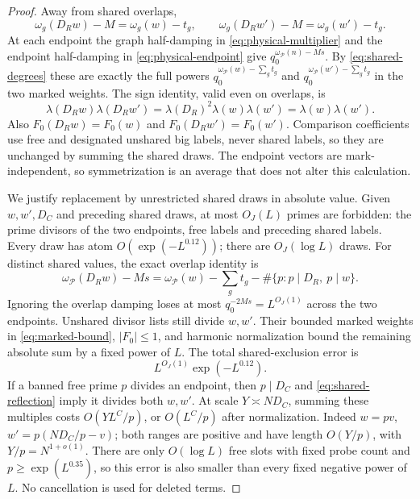 \documentclass[11pt]{article}
\theoremstyle{definition}
\newcommand{\Pset}{\mathcal P}
\theoremstyle{remark}
\begin{document}
\begin{proof}
Away from shared overlaps,
\begin{equation}\label{eq:shared-degrees}
\omega_g(D_Rw)-M=\omega_g(w)-t_g,\qquad
\omega_g(D_Rw')-M=\omega_g(w')-t_g.
\end{equation}
At each endpoint the graph half-damping in
\eqref{eq:physical-multiplier} and the endpoint half-damping in
\eqref{eq:physical-endpoint} give
$q_0^{\omega_{\Pset}(n)-Ms}$.
By \eqref{eq:shared-degrees} these are exactly the full powers
$q_0^{\omega_{\Pset}(w)-\sum_gt_g}$ and
$q_0^{\omega_{\Pset}(w')-\sum_gt_g}$ in the two marked weights.
The sign identity, valid even on overlaps, is
\begin{equation}\label{eq:shared-sign}
\lambda(D_Rw)\lambda(D_Rw')
=\lambda(D_R)^2\lambda(w)\lambda(w')
=\lambda(w)\lambda(w').
\end{equation}
Also $F_0(D_Rw)=F_0(w)$ and $F_0(D_Rw')=F_0(w')$.
Comparison coefficients use free and designated unshared big labels,
never shared labels, so they are unchanged by summing the shared draws.
The endpoint vectors are mark-independent, so symmetrization is an
average that does not alter this calculation.

We justify replacement by unrestricted shared draws in absolute
value. Given $w,w',D_C$ and preceding shared draws, at most
$O_J(L)$ primes are forbidden: the prime divisors of the two endpoints,
free labels and preceding shared labels.
Every draw has atom $O(\exp(-L^{0.12}))$; there are $O_J(\log L)$
draws. For distinct shared values, the exact overlap identity is
\begin{equation}\label{eq:overlap-degree}
\omega_{\Pset}(D_Rw)-Ms
=\omega_{\Pset}(w)-\sum_gt_g
-\#\{p:p\mid D_R,\ p\mid w\}.
\end{equation}
Ignoring the overlap damping loses at most
$q_0^{-2Ms}=L^{O_J(1)}$ across the two endpoints.
Unshared divisor lists still divide $w,w'$.
Their bounded marked weights in \eqref{eq:marked-bound}, $|F_0|\le1$,
and harmonic normalization bound the remaining absolute sum by a
fixed power of $L$.
The total shared-exclusion error is
\begin{equation}\label{eq:shared-error}
L^{O_J(1)}\exp(-L^{0.12}).
\end{equation}
If a banned free prime $p$ divides an endpoint, then $p\mid D_C$
and \eqref{eq:shared-reflection} imply it divides both $w,w'$.
At scale $Y\asymp ND_C$, summing these multiples costs
$O(YL^C/p)$, or $O(L^C/p)$ after normalization.
Indeed $w=pv$, $w'=p(ND_C/p-v)$; both ranges are positive and
have length $O(Y/p)$, with $Y/p=N^{1+o(1)}$.
There are only $O(\log L)$ free slots with fixed probe count and
$p\ge\exp(L^{0.35})$, so this error is also smaller than every
fixed negative power of $L$. No cancellation is used for deleted terms.


\end{proof}
\end{document}
